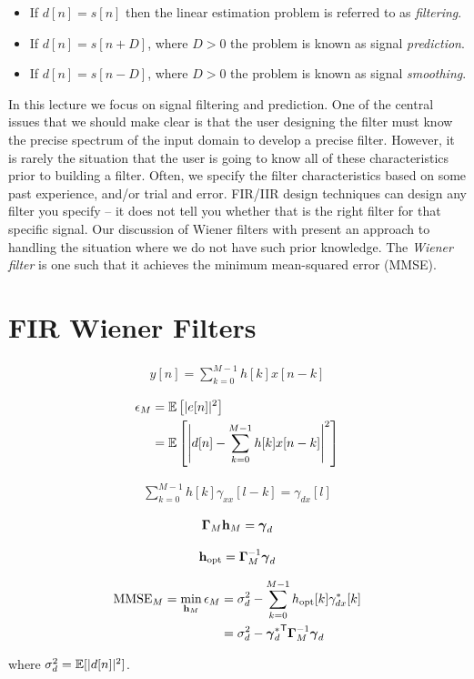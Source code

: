 \documentclass[12pt]{article}
\begin{document}
\begin{itemize}
  \item If $d[n] = s[n]$ then the linear estimation problem is referred to as {\em filtering}. 
  \item If $d[n] = s[n+D]$, where $D > 0$ the problem is known as signal {\em prediction}. 
  \item If $d[n] = s[n-D]$, where $D > 0$ the problem is known as signal {\em smoothing}. 
\end{itemize}

In this lecture we focus on signal filtering and prediction. One of the central issues that we should make clear is that the user designing the filter must know the precise spectrum of the input domain to develop a precise filter. However, it is rarely the situation that the user is going to know all of these characteristics prior to building a filter. Often, we specify the filter characteristics based on some past experience, and/or trial and error. FIR/IIR design techniques can design any filter you specify -- it does not tell you whether that is the right filter for that specific signal. Our discussion of Wiener filters with present an approach to handling the situation where we do not have such prior knowledge. The {\em Wiener filter} is one such that it achieves the minimum mean-squared error (MMSE). 



\section{FIR Wiener Filters}


\begin{align}
  y[n] = \sum_{k=0}^{M-1} h[k] x[n-k]
\end{align}

\begin{align}
  \epsilon_M &= {\mathbb E}\left[ |e[n]|^2 \right] \nonumber \\
  &= {\mathbb E}\left[ \left| d[n] -  \sum_{k=0}^{M-1} h[k] x[n-k] \right|^2 \right]
\end{align}

\begin{align}
  \sum_{k=0}^{M-1} h[k] \gamma_{xx}[l-k] = \gamma_{dx}[l]
\end{align}

\begin{align}
  \boldsymbol{\Gamma}_M {\mathbf h}_{M} = \boldsymbol{\gamma}_d
\end{align}

\begin{align}
  {\mathbf h}_{\textrm{opt}} = \boldsymbol{\Gamma}_M^{-1} \boldsymbol{\gamma}_d
\end{align}

\begin{align}
  \textrm{MMSE}_{M} = \min_{{\mathbf h}_M} \epsilon_M &= \sigma_d^2 - \sum_{k=0}^{M-1}h_{\textrm{opt}}[k] \gamma_{dx}^*[k] \\
  &= \sigma_d^2 - {\boldsymbol{\gamma}_d^*}^{{\textsf{T}}} \boldsymbol{\Gamma}_M^{-1} \boldsymbol{\gamma}_d
\end{align}

where $\sigma_d^2 = {\mathbb E}[|d[n]|^2]$.
\end{document}
